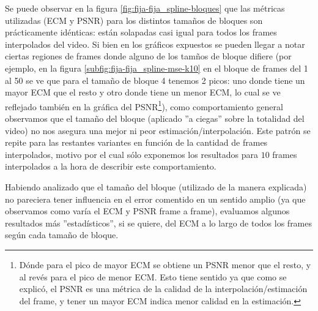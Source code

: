 \par Se puede observar en la figura \ref{fig:fija-fija_spline-bloques} que las
m\'etricas utilizadas (ECM y PSNR) para los distintos tama\~nos de bloques son
pr\'acticamente id\'enticas: est\'an solapadas casi igual para todos los frames
interpolados del video. Si bien en los gr\'aficos expuestos se pueden llegar a
notar ciertas regiones de frames donde alguno de los tam\~nos de bloque difiere
(por ejemplo, en la figura \ref{subfig:fija-fija_spline-mse-k10} en el bloque de
frames del 1 al 50 se ve que para el tama\~no de bloque 4 tenemos 2 picos: uno
donde tiene un mayor ECM que el resto y otro donde tiene un menor ECM, lo cual
se ve reflejado tambi\'en en la gr\'afica del PSNR\footnote{D\'onde para el pico
de mayor ECM se obtiene un PSNR menor que el resto, y al rev\'es para el pico de
menor ECM. Esto tiene sentido ya que como se explic\'o, el PSNR es una m\'etrica
de la calidad de la interpolaci\'on/estimaci\'on del frame, y tener un mayor
ECM indica menor calidad en la estimaci\'on.}), como comportamiento general
observamos que el tama\~no del bloque (aplicado ''a ciegas'' sobre la totalidad
del video) no nos asegura una mejor ni peor estimaci\'on/interpolaci\'on. Este
patr\'on se repite para las restantes variantes en funci\'on de la cantidad
de frames interpolados, motivo por el cual s\'olo exponemos los resultados para
$10$ frames interpolados a la hora de describir este comportamiento.

\par Habiendo analizado que el tama\~no del bloque (utilizado de la manera
explicada) no pareciera tener influencia en el error comentido en un sentido
amplio (ya que observamos como var\'ia el ECM y PSNR frame a frame), evaluamos
algunos resultados m\'as ''estad\'isticos'', si se quiere, del ECM a lo largo
de todos los frames seg\'un cada tama\~no de bloque.

